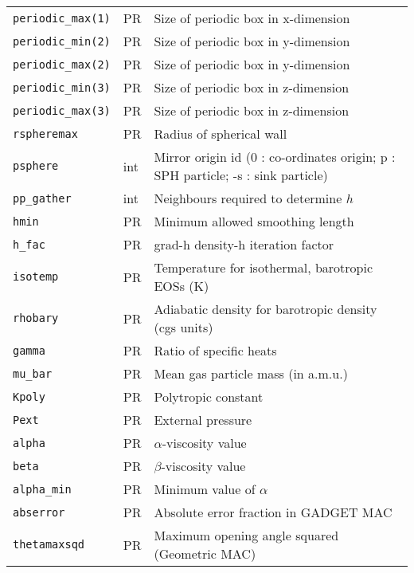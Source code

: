 \documentclass[a4paper]{article}
\newcommand{\var}[1]{\texttt{#1}}
\begin{document}
\begin{center}
\begin{supertabular}{|p{3cm}|p{2cm}|p{8cm}|}
\var{periodic\_max(1)} & PR & Size of periodic box in x-dimension \\
\var{periodic\_min(2)} & PR & Size of periodic box in y-dimension \\
\var{periodic\_max(2)} & PR & Size of periodic box in y-dimension \\
\var{periodic\_min(3)} & PR & Size of periodic box in z-dimension \\
\var{periodic\_max(3)} & PR & Size of periodic box in z-dimension \\ 
\var{rspheremax}       & PR & Radius of spherical wall \\ 
\var{psphere}    & int      & Mirror origin id (0 : co-ordinates origin; p : SPH particle; -s : sink particle) \\ \hline
%
\var{pp\_gather} & int      & Neighbours required to determine $h$ \\
\var{hmin}       & PR       & Minimum allowed smoothing length \\
\var{h\_fac}     & PR       & grad-h density-h iteration factor \\ \hline
\var{isotemp}    & PR & Temperature for isothermal, barotropic EOSs (K) \\
\var{rhobary}    & PR & Adiabatic density for barotropic density (cgs units) \\
\var{gamma}      & PR & Ratio of specific heats \\
\var{mu\_bar}    & PR       & Mean gas particle mass (in a.m.u.) \\
\var{Kpoly}      & PR & Polytropic constant \\ 
\var{Pext}       & PR & External pressure \\ \hline
\var{alpha}      & PR       & $\alpha$-viscosity value \\
\var{beta}       & PR       & $\beta$-viscosity value \\
\var{alpha\_min} & PR       & Minimum value of $\alpha$ \\ \hline
\var{abserror}   & PR       & Absolute error fraction in GADGET MAC \\ 
\var{thetamaxsqd}& PR       & Maximum opening angle squared (Geometric MAC) \\

\end{supertabular}
\end{center}
\end{document}
